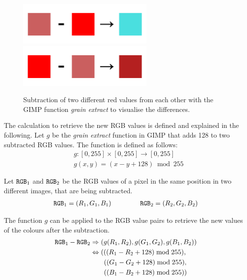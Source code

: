 \documentclass[../MasterThesis.tex]{subfiles}
\begin{document}




\begin{figure}[H]
	
	\centering
	
	\includegraphics[width=0.6\textwidth]{lightMINUSneon.png}
	\includegraphics[width=0.6\textwidth]{neonMINUSlight.png}
	
	\caption[Colour subtraction with the GIMP function \textit{grain extract}.]{Subtraction of two different red values from each other with the GIMP function \textit{grain extract} to visualise the differences.}
	\label{figure:neonminuslight}
	
\end{figure}

The calculation to retrieve the new RGB values is defined and explained in the following.
Let $g$ be the \textit{grain extract} function in GIMP that adds 128 to two subtracted RGB values. The function is defined as follows:
%
\begin{align*}
	& g: [0, 255] \times [0, 255] \to [0, 255] \\
	& g(x, y) = (x - y + 128) \bmod 255
\end{align*}

Let $\text{\texttt{RGB}}_1$ and $\text{\texttt{RGB}}_2$ be the RGB values of a pixel in the same position in two different images, that are being subtracted.
%
\begin{align*}
	\text{\texttt{RGB}}_1 = (R_1, G_1, B_1) \ \ \ \ \ \ \ \ \ \ \ \ \ 
	\text{\texttt{RGB}}_2 = (R_2, G_2, B_2)
\end{align*}

The function $g$ can be applied to the RGB value pairs to retrieve the new values of the colours after the subtraction.
%
\begin{align*}
	\text{\texttt{RGB}}_1 - \text{\texttt{RGB}}_2 & \Rightarrow (g(R_1, R_2), g(G_1, G_2), g(B_1, B_2)) \\
	 & \Leftrightarrow (((R_1 - R_2 + 128)\bmod 255), \\
	 & \ \ \ \ \ \ ((G_1 - G_2 + 128) \bmod 255), \\
	 & \ \ \ \ \ \ ((B_1 - B_2 + 128)\bmod 255)) 
\end{align*}
\end{document}

